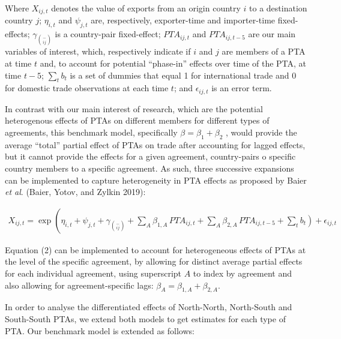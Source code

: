 Where \(X_{ij,t}\) denotes the value of exports from an origin country
\(i\) to a destination country \(j\); \(\eta_{i,t}\) and \(\psi_{j,t}\)
are, respectively, exporter-time and importer-time fixed-effects;
\(\gamma_{\binom{-}{ij}}\) is a country-pair fixed-effect;
\({PTA}_{ij,t}\) and \({PTA}_{ij,t - 5}\) are our main variables of
interest, which, respectively indicate if \(i\) and \(j\) are members of
a PTA at time \(t\) and, to account for potential ``phase-in'' effects
over time of the PTA, at time \(t - 5\); \(\sum_{t}^{}b_{t}\) is a set
of dummies that equal 1 for international trade and 0 for domestic trade
observations at each time \(t\); and \(\epsilon_{ij,t}\) is an error
term.

In contrast with our main interest of research, which are the potential
heterogenous effects of PTAs on different members for different types of
agreements, this benchmark model, specifically
\(\beta = \beta_{1} + \beta_{2}\) , would provide the average ``total''
partial effect of PTAs on trade after accounting for lagged effects, but
it cannot provide the effects for a given agreement, country-pairs o
specific country members to a specific agreement. As such, three
successive expansions can be implemented to capture heterogeneity in PTA
effects as proposed by Baier \emph{et al}. (Baier, Yotov, and Zylkin
2019):

\begin{multline}
    X_{ij,t} = \exp\left(\eta_{i,t} + \psi_{j,t} + \gamma_{\binom{-}{ij}} + \sum_{A} \beta_{1,A} \, PTA_{ij,t} \right. + \sum_{A} \beta_{2,A} \, PTA_{ij,t-5} + \left. \sum_{t} b_{t} \right) + \epsilon_{ij,t}
\end{multline}

Equation (2) can be implemented to account for heterogeneous effects of
PTAs at the level of the specific agreement, by allowing for distinct
average partial effects for each individual agreement, using superscript
\(A\) to index by agreement and also allowing for agreement-specific
lags: \(\beta_{A} = \beta_{1,A} + \beta_{2,A}\).

In order to analyse the differentiated effects of North-North,
North-South and South-South PTAs, we extend both models to get estimates
for each type of PTA. Our benchmark model is extended as follows:


